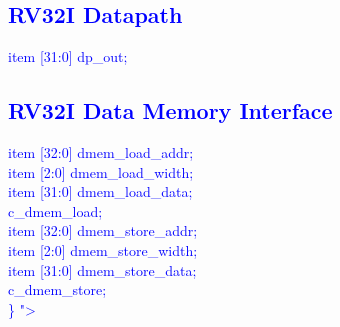 \subsection{\textcolor{blue}{RV32I Datapath}}

\textcolor{blue}{
\indent item [31:0] dp\_out;\\%
}

\subsection{\textcolor{blue}{RV32I Data Memory Interface}}

\textcolor{blue}{
\indent item [32:0] dmem\_load\_addr;\\%
\indent item [2:0] dmem\_load\_width;\\%
\indent item [31:0] dmem\_load\_data;\\%
\indent c\_dmem\_load;\\%
\indent item [32:0] dmem\_store\_addr;\\%
\indent item [2:0] dmem\_store\_width;\\%
\indent item [31:0] dmem\_store\_data;\\%
\indent c\_dmem\_store;\\%
\} "\textgreater\\%
}
\newpage
